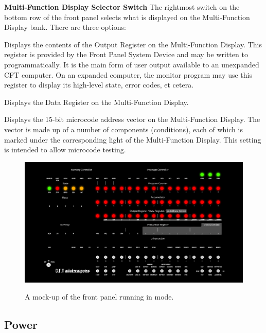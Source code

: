 \begin{description}
\item{\bfseries Multi-Function Display Selector Switch} The rightmost switch
  on the bottom row of the front panel selects what is displayed on
  the Multi-Function Display bank. There are three options:
  \begin{description}
  \item{\bfseries{}} Displays the contents of the Output Register
    on the Multi-Function Display. This register is provided by the
    Front Panel System Device and may be written to
    programmatically. It is the main form of user output available to
    an unexpanded CFT computer. On an expanded computer, the monitor
    program may use this register to display its high-level state,
    error codes, et cetera.
  \item{\bfseries{}} Displays the Data Register on the Multi-Function
    Display.
  \item{\bfseries{}} Displays the 15-bit microcode address
    vector on the Multi-Function Display. The vector is made up of a
    number of components (conditions), each of which is marked under
    the corresponding light of the Multi-Function Display. This
    setting is intended to allow microcode testing.
  \end{description}
\end{description}

\begin{figure}
\centering
\includegraphics[width=0.8\columnwidth]{figs/front-panel-v2-terse-small.jpg}\\
\caption{\label{fig-panel-terse}A mock-up of the front panel running in  mode.}
\end{figure}

\subsection{Power}


